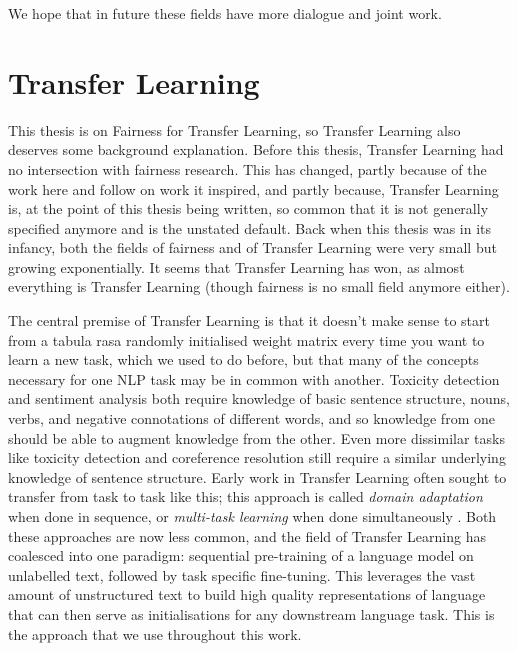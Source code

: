We hope that in future these fields have more dialogue and joint work. 

\section{Transfer Learning}
This thesis is on Fairness for Transfer Learning, so Transfer Learning also deserves some background explanation. Before this thesis, Transfer Learning had no intersection with fairness research. This has changed, partly because of the work here and follow on work it inspired, and partly because, Transfer Learning is, at the point of this thesis being written, so common that it is not generally specified anymore and is the unstated default. Back when this thesis was in its infancy, both the fields of fairness and of Transfer Learning were very small but growing exponentially. It seems that Transfer Learning has won, as almost everything is Transfer Learning (though fairness is no small field anymore either).

The central premise of Transfer Learning is that it doesn't make sense to start from a tabula rasa randomly initialised weight matrix every time you want to learn a new task, which we used to do before, but that many of the concepts necessary for one NLP task may be in common with another. Toxicity detection and sentiment analysis both require knowledge of basic sentence structure, nouns, verbs, and negative connotations of different words, and so knowledge from one should be able to augment knowledge from the other. Even more dissimilar tasks like toxicity detection and coreference resolution still require a similar underlying knowledge of sentence structure. Early work in Transfer Learning often sought to transfer from task to task like this; this approach is called \textit{domain adaptation} when done in sequence, or \textit{multi-task learning} when done simultaneously \citep{ruder2019transfer}. Both these approaches are now less common, and the field of Transfer Learning has coalesced into one paradigm: sequential pre-training of a language model on unlabelled text, followed by task specific fine-tuning. This leverages the vast amount of unstructured text to build high quality representations of language that can then serve as initialisations for any downstream language task. This is the approach that we use throughout this work.


